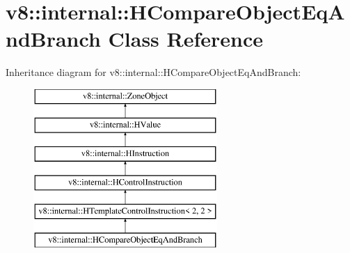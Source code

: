 \hypertarget{classv8_1_1internal_1_1_h_compare_object_eq_and_branch}{}\section{v8\+:\+:internal\+:\+:H\+Compare\+Object\+Eq\+And\+Branch Class Reference}
\label{classv8_1_1internal_1_1_h_compare_object_eq_and_branch}
Inheritance diagram for v8\+:\+:internal\+:\+:H\+Compare\+Object\+Eq\+And\+Branch\+:\begin{figure}[H]
\begin{center}
\leavevmode
\includegraphics[height=6.000000cm]{classv8_1_1internal_1_1_h_compare_object_eq_and_branch}
\end{center}
\end{figure}

